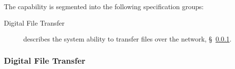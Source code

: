 The \ThisSys capability is segmented into the following specification groups:

\begin{description}
	\item [Digital File Transfer] describes the system ability to transfer files over the network, \S~\ref{loc:CAP_Network_Transfer}.
\end{description}

\renewcommand{\ThisSegment}{Capability One\xspace}%

\KNEADSUBSUBSECTIONNEWPAGE
\subsubsection{Digital File Transfer}
\label{loc:CAP_Network_Transfer}




%
%